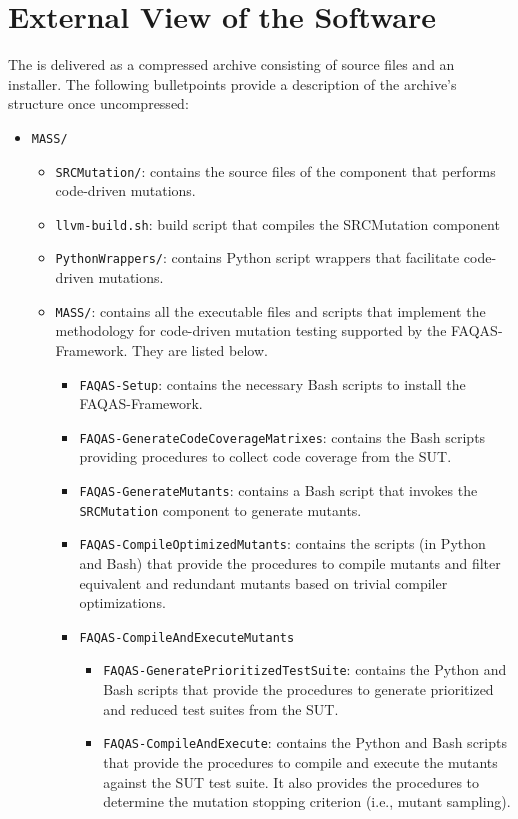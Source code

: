 
\chapter{External View of the Software}

The \FAQAS is delivered as a compressed archive consisting of source files and an installer.
The following bulletpoints provide a description of the archive's structure once uncompressed:

\begin{itemize}
	\item \texttt{MASS/}
	\begin{itemize}
		\item \texttt{SRCMutation/}: contains the source files of the component that performs code-driven mutations.
		\item \texttt{llvm-build.sh}: build script that compiles the SRCMutation component
		\item \texttt{PythonWrappers/}: contains Python script wrappers that facilitate code-driven mutations.
		\item \texttt{MASS/}: contains all the executable files and scripts that implement the methodology for code-driven mutation testing supported by  the FAQAS-Framework. They are listed below.
		\begin{itemize}
			\item \texttt{FAQAS-Setup}: contains the necessary Bash scripts to install the FAQAS-Framework.
			\item \texttt{FAQAS-GenerateCodeCoverageMatrixes}: contains the Bash scripts providing procedures to collect code coverage from the SUT.
			\item \texttt{FAQAS-GenerateMutants}: contains a Bash script that invokes the \texttt{SRCMutation} component to generate mutants.
			\item \texttt{FAQAS-CompileOptimizedMutants}: contains the scripts (in Python and Bash)  that provide the procedures to compile mutants and filter equivalent and redundant mutants based on trivial compiler optimizations.
			\item \texttt{FAQAS-CompileAndExecuteMutants}
			\begin{itemize}
				\item \texttt{FAQAS-GeneratePrioritizedTestSuite}: contains the Python and Bash scripts that provide the procedures to generate prioritized and reduced test suites from the SUT.

				\item \texttt{FAQAS-CompileAndExecute}: contains the Python and Bash scripts that provide the procedures to compile and execute the mutants against the SUT test suite. It also provides the procedures to determine the mutation stopping criterion (i.e., mutant sampling).


\end{itemize}
\end{itemize}
\end{itemize}
\end{itemize}
